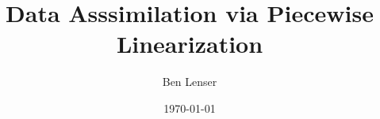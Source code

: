 \documentclass[
	12pt,
	a4paper,
	twoside,
	titlepage,
	parskip=half,
	BCOR=10mm,
	bibliography=totoc,
	headings=normal,
	DIV=calc,
]{scrreprt}
\begin{document}
\author{Ben Lenser}
\title{Data Asssimilation via Piecewise Linearization}
\date{\today}

  

\cleardoublepage
{}










\begin{spacing}{1}
 \printbibliography
\end{spacing}

\appendix



\end{document}
